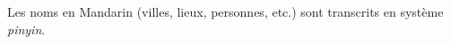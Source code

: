 Les noms en Mandarin (villes, lieux, personnes, etc.) sont transcrits en système \emph{pinyin}.




\endgroup			

\vfill









